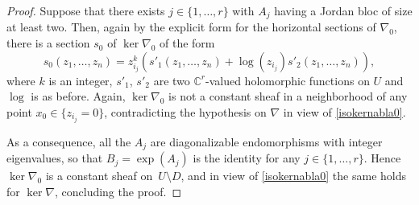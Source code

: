 \documentclass[10pt,a4paper]{amsart}
\numberwithin{equation}{section}
\begin{document}
\begin{proof}
Suppose that there exists $j\in \{1,\dots,r\}$ with $A_j$ having a Jordan bloc of size at least two. Then, again by the explicit form for the horizontal sections of $\nabla_0$, there is a section $s_0$ of $\ker  \nabla_0$ of the form
\[s_0(z_1,\dots,z_n)=z_{i_j}^k (s'_1(z_1,\dots,z_n)+\log(z_{i_j})s'_2(z_1,\dots,z_n)),\]
 where $k$ is an integer, $s'_1$, $s'_2$ are two $\mathbb{C}^r$-valued holomorphic functions on $U$ and $\log$ is as before. Again, $\ker  \nabla_0$ is not a constant sheaf in a neighborhood of any point $x_0\in \{z_{i_j}=0\}$, contradicting the hypothesis on $\nabla$ in view of \eqref{isokernabla0}.

As a consequence, all the $A_j$ are diagonalizable endomorphisms with integer eigenvalues, so that $B_j=\exp(A_j)$ is the identity for any $j\in \{1,\dots,r\}$. Hence $\ker  \nabla_0$ is a constant sheaf on~$U\setminus D$, and in view of \eqref{isokernabla0} the same holds for $\ker  \nabla$, concluding the proof.
\end{proof}
\end{document}
